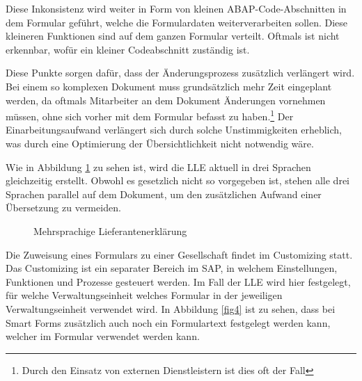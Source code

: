 	Diese Inkonsistenz wird weiter in Form von kleinen \ac{ABAP}-Code-Abschnitten in dem Formular geführt, welche die Formulardaten weiterverarbeiten sollen. Diese kleineren Funktionen sind auf dem ganzen Formular verteilt. Oftmals ist nicht erkennbar, wofür ein kleiner Codeabschnitt zuständig ist.
	
	Diese Punkte sorgen dafür, dass der Änderungsprozess zusätzlich verlängert wird. Bei einem so komplexen Dokument muss grundsätzlich mehr Zeit eingeplant werden, da oftmals Mitarbeiter an dem Dokument Änderungen vornehmen müssen, ohne sich vorher mit dem Formular befasst zu haben.\footnote{Durch den Einsatz von externen Dienstleistern ist dies oft der Fall} Der Einarbeitungsaufwand verlängert sich durch solche Unstimmigkeiten erheblich, was durch eine Optimierung der Übersichtlichkeit nicht notwendig wäre.
	
	Wie in Abbildung \ref{fig3} zu sehen ist, wird die \ac{LLE} aktuell in drei Sprachen gleichzeitig erstellt. Obwohl es gesetzlich nicht so vorgegeben ist, stehen alle drei Sprachen parallel auf dem Dokument, um den zusätzlichen Aufwand einer Übersetzung zu vermeiden.
	
	\begin{figure}[ht]
		\centering
		\caption{Mehrsprachige Lieferantenerklärung}
		\label{fig3}
	\end{figure}
	


	Die Zuweisung eines Formulars zu einer Gesellschaft findet im Customizing statt. Das Customizing ist ein separater Bereich im SAP, in welchem Einstellungen, Funktionen und Prozesse gesteuert werden. Im Fall der \ac{LLE} wird hier festgelegt, für welche Verwaltungseinheit welches Formular in der jeweiligen Verwaltungseinheit verwendet wird. In Abbildung \ref{fig4} ist zu sehen, dass bei Smart Forms zusätzlich auch noch ein Formulartext festgelegt werden kann, welcher im Formular verwendet werden kann.
	
